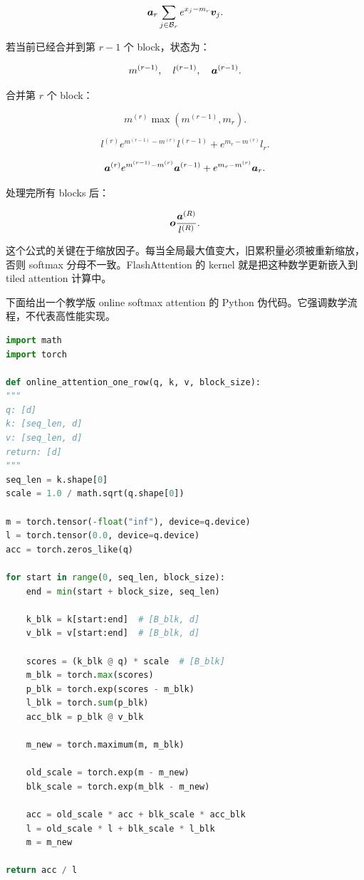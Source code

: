 \[
\bm{a}_r
\sum_{j\in\mathcal{B}_r}
e^{x_j-m_r}\bm{v}_j.
\]

若当前已经合并到第 $r-1$ 个 block，状态为：

\[
m^{(r-1)},\quad l^{(r-1)},\quad \bm{a}^{(r-1)}.
\]

合并第 $r$ 个 block：

\[
m^{(r)}
\max(m^{(r-1)},m_r).
\]

\[
l^{(r)}
e^{m^{(r-1)}-m^{(r)}}l^{(r-1)}
+
e^{m_r-m^{(r)}}l_r.
\]

\[
\bm{a}^{(r)}
e^{m^{(r-1)}-m^{(r)}}\bm{a}^{(r-1)}
+
e^{m_r-m^{(r)}}\bm{a}_r.
\]

处理完所有 blocks 后：

\[
\bm{o}
\frac{\bm{a}^{(R)}}{l^{(R)}}.
\]

这个公式的关键在于缩放因子。每当全局最大值变大，旧累积量必须被重新缩放，否则 softmax 分母不一致。FlashAttention 的 kernel 就是把这种数学更新嵌入到 tiled attention 计算中。

下面给出一个教学版 online softmax attention 的 Python 伪代码。它强调数学流程，不代表高性能实现。

\begin{lstlisting}[language=Python,caption={教学版 Online Softmax Attention 伪代码},label={lst:online-softmax-attention-pseudocode}]
import math
import torch

def online_attention_one_row(q, k, v, block_size):
"""
q: [d]
k: [seq_len, d]
v: [seq_len, d]
return: [d]
"""
seq_len = k.shape[0]
scale = 1.0 / math.sqrt(q.shape[0])

m = torch.tensor(-float("inf"), device=q.device)
l = torch.tensor(0.0, device=q.device)
acc = torch.zeros_like(q)

for start in range(0, seq_len, block_size):
    end = min(start + block_size, seq_len)

    k_blk = k[start:end]  # [B_blk, d]
    v_blk = v[start:end]  # [B_blk, d]

    scores = (k_blk @ q) * scale  # [B_blk]
    m_blk = torch.max(scores)
    p_blk = torch.exp(scores - m_blk)
    l_blk = torch.sum(p_blk)
    acc_blk = p_blk @ v_blk

    m_new = torch.maximum(m, m_blk)

    old_scale = torch.exp(m - m_new)
    blk_scale = torch.exp(m_blk - m_new)

    acc = old_scale * acc + blk_scale * acc_blk
    l = old_scale * l + blk_scale * l_blk
    m = m_new

return acc / l

\end{lstlisting}

